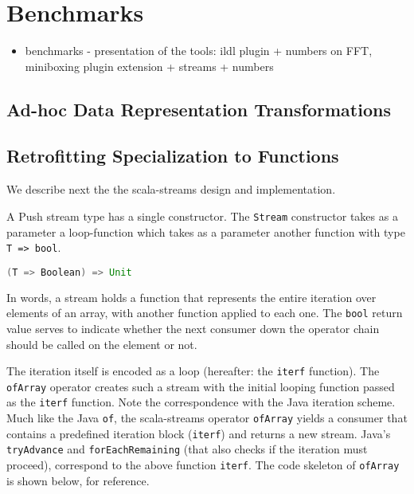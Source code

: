 \section{Benchmarks}
\label{sec:benchmarks}
\begin{itemize}
  \item benchmarks - presentation of the tools: ildl plugin + numbers on FFT, miniboxing plugin extension + streams + numbers
\end{itemize}

\subsection{Ad-hoc Data Representation Transformations}
\label{sec:benchmarks:ad-hoc}

\subsection{Retrofitting Specialization to Functions}

\label{sec:benchmarks:funcs}
We describe next the the scala-streams design and implementation. 

A Push stream type has a single constructor. The \verb|Stream| constructor takes
as a parameter a loop-function which takes as a parameter another function with
type \verb|T => bool|.

\begin{lstlisting}[language=Scala]
(T => Boolean) => Unit
\end{lstlisting}

In words, a stream holds a function that represents the entire iteration over
elements of an array, with another function applied to each one.  The
\verb|bool| return value serves to indicate whether the next consumer down the
operator chain should be called on the element or not.

The iteration itself is encoded as a loop (hereafter: the \verb|iterf|
function). The \verb|ofArray| operator creates such a stream with the initial
looping function passed as the \verb|iterf| function. Note the correspondence
with the Java iteration scheme. Much like the Java \verb|of|, the scala-streams
operator \verb|ofArray| yields a consumer that contains a predefined iteration
block (\verb|iterf|) and returns a new stream.  Java's \verb|tryAdvance| and
\verb|forEachRemaining| (that also checks if the iteration must proceed),
correspond to the above function \verb|iterf|. The code skeleton of
\verb|ofArray| is shown below, for reference.


